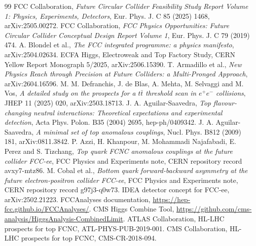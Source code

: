 \documentclass[11pt,a4paper]{report}
\begin{document}
\begin{thebibliography}{99}
 FCC Collaboration, \emph{Future Circular Collider Feasibility Study Report Volume 1: Physics, Experiments, Detectors}, Eur. Phys. J. C 85 (2025) 1468, arXiv:2505.00272.
 FCC Collaboration, \emph{FCC Physics Opportunities: Future Circular Collider Conceptual Design Report Volume 1}, Eur. Phys. J. C 79 (2019) 474.
 A. Blondel et al., \emph{The FCC integrated programme: a physics manifesto}, arXiv:2504.02634.
 ECFA Higgs, Electroweak and Top Factory Study, CERN Yellow Report Monograph 5/2025, arXiv:2506.15390.
 T. Armadillo et al., \emph{New Physics Reach through Precision at Future Colliders: a Multi-Pronged Approach}, arXiv:2604.16596.
 M. M. Defranchis, J. de Blas, A. Mehta, M. Selvaggi and M. Vos, \emph{A detailed study on the prospects for a $t\bar t$ threshold scan in $e^+e^-$ collisions}, JHEP 11 (2025) 020, arXiv:2503.18713.
 J. A. Aguilar-Saavedra, \emph{Top flavour-changing neutral interactions: Theoretical expectations and experimental detection}, Acta Phys. Polon. B35 (2004) 2695, hep-ph/0409342.
 J. A. Aguilar-Saavedra, \emph{A minimal set of top anomalous couplings}, Nucl. Phys. B812 (2009) 181, arXiv:0811.3842.
 P. Azzi, H. Khanpour, M. Mohammadi Najafabadi, E. Perez and S. Tizchang, \emph{Top quark FCNC anomalous couplings at the future collider FCC-ee}, FCC Physics and Experiments note, CERN repository record avxy7-mtz86.
 M. Cobal et al., \emph{Bottom quark forward-backward asymmetry at the future electron-positron collider FCC-ee}, FCC Physics and Experiments note, CERN repository record g97j3-q0w73.
 IDEA detector concept for FCC-ee, arXiv:2502.21223.
 FCCAnalyses documentation, \url{https://hep-fcc.github.io/FCCAnalyses/}.
 CMS Higgs Combine Tool, \url{https://github.com/cms-analysis/HiggsAnalysis-CombinedLimit}.
 ATLAS Collaboration, HL-LHC prospects for top FCNC, ATL-PHYS-PUB-2019-001.
 CMS Collaboration, HL-LHC prospects for top FCNC, CMS-CR-2018-094.

\end{thebibliography}
\end{document}
